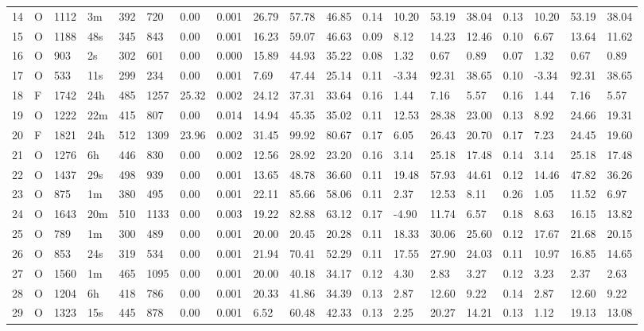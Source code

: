 \begin{tabular}{rllllllrlllllllllll}
14 & O & 1112 & 3m & 392 & 720 & 0.00 & 0.001 & 26.79 & 57.78 & 46.85 & 0.14 & 10.20 & 53.19 & 38.04 & 0.13 & 10.20 & 53.19 & 38.04 \\
15 & O & 1188 & 48s & 345 & 843 & 0.00 & 0.001 & 16.23 & 59.07 & 46.63 & 0.09 & 8.12 & 14.23 & 12.46 & 0.10 & 6.67 & 13.64 & 11.62 \\
16 & O & 903 & 2s & 302 & 601 & 0.00 & 0.000 & 15.89 & 44.93 & 35.22 & 0.08 & 1.32 & 0.67 & 0.89 & 0.07 & 1.32 & 0.67 & 0.89 \\
17 & O & 533 & 11s & 299 & 234 & 0.00 & 0.001 & 7.69 & 47.44 & 25.14 & 0.11 & -3.34 & 92.31 & 38.65 & 0.10 & -3.34 & 92.31 & 38.65 \\
18 & F & 1742 & 24h & 485 & 1257 & 25.32 & 0.002 & 24.12 & 37.31 & 33.64 & 0.16 & 1.44 & 7.16 & 5.57 & 0.16 & 1.44 & 7.16 & 5.57 \\
19 & O & 1222 & 22m & 415 & 807 & 0.00 & 0.014 & 14.94 & 45.35 & 35.02 & 0.11 & 12.53 & 28.38 & 23.00 & 0.13 & 8.92 & 24.66 & 19.31 \\
20 & F & 1821 & 24h & 512 & 1309 & 23.96 & 0.002 & 31.45 & 99.92 & 80.67 & 0.17 & 6.05 & 26.43 & 20.70 & 0.17 & 7.23 & 24.45 & 19.60 \\
21 & O & 1276 & 6h & 446 & 830 & 0.00 & 0.002 & 12.56 & 28.92 & 23.20 & 0.16 & 3.14 & 25.18 & 17.48 & 0.14 & 3.14 & 25.18 & 17.48 \\
22 & O & 1437 & 29s & 498 & 939 & 0.00 & 0.001 & 13.65 & 48.78 & 36.60 & 0.11 & 19.48 & 57.93 & 44.61 & 0.12 & 14.46 & 47.82 & 36.26 \\
23 & O & 875 & 1m & 380 & 495 & 0.00 & 0.001 & 22.11 & 85.66 & 58.06 & 0.11 & 2.37 & 12.53 & 8.11 & 0.26 & 1.05 & 11.52 & 6.97 \\
24 & O & 1643 & 20m & 510 & 1133 & 0.00 & 0.003 & 19.22 & 82.88 & 63.12 & 0.17 & -4.90 & 11.74 & 6.57 & 0.18 & 8.63 & 16.15 & 13.82 \\
25 & O & 789 & 1m & 300 & 489 & 0.00 & 0.001 & 20.00 & 20.45 & 20.28 & 0.11 & 18.33 & 30.06 & 25.60 & 0.12 & 17.67 & 21.68 & 20.15 \\
26 & O & 853 & 24s & 319 & 534 & 0.00 & 0.001 & 21.94 & 70.41 & 52.29 & 0.11 & 17.55 & 27.90 & 24.03 & 0.11 & 10.97 & 16.85 & 14.65 \\
27 & O & 1560 & 1m & 465 & 1095 & 0.00 & 0.001 & 20.00 & 40.18 & 34.17 & 0.12 & 4.30 & 2.83 & 3.27 & 0.12 & 3.23 & 2.37 & 2.63 \\
28 & O & 1204 & 6h & 418 & 786 & 0.00 & 0.001 & 20.33 & 41.86 & 34.39 & 0.13 & 2.87 & 12.60 & 9.22 & 0.14 & 2.87 & 12.60 & 9.22 \\
29 & O & 1323 & 15s & 445 & 878 & 0.00 & 0.001 & 6.52 & 60.48 & 42.33 & 0.13 & 2.25 & 20.27 & 14.21 & 0.13 & 1.12 & 19.13 & 13.08 \\

\end{tabular}
